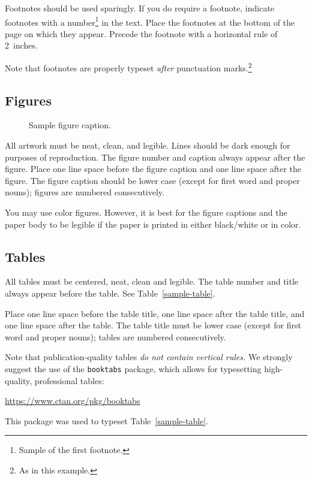 \documentclass[a4paper]{article}
\begin{document}
Footnotes should be used sparingly.  If you do require a footnote, indicate
footnotes with a number\footnote{Sample of the first footnote.} in the
text. Place the footnotes at the bottom of the page on which they appear.
Precede the footnote with a horizontal rule of 2~inches.


Note that footnotes are properly typeset \emph{after} punctuation
marks.\footnote{As in this example.}


\subsection{Figures}


\begin{figure}
  \centering
  \fbox{\rule[-.5cm]{0cm}{4cm} \rule[-.5cm]{4cm}{0cm}}
  \caption{Sample figure caption.}
\end{figure}


All artwork must be neat, clean, and legible. Lines should be dark enough for
purposes of reproduction. The figure number and caption always appear after the
figure. Place one line space before the figure caption and one line space after
the figure. The figure caption should be lower case (except for first word and
proper nouns); figures are numbered consecutively.


You may use color figures.  However, it is best for the figure captions and the
paper body to be legible if the paper is printed in either black/white or in
color.


\subsection{Tables}


All tables must be centered, neat, clean and legible.  The table number and
title always appear before the table.  See Table~\ref{sample-table}.


Place one line space before the table title, one line space after the
table title, and one line space after the table. The table title must
be lower case (except for first word and proper nouns); tables are
numbered consecutively.


Note that publication-quality tables \emph{do not contain vertical rules.} We
strongly suggest the use of the \verb+booktabs+ package, which allows for
typesetting high-quality, professional tables:
\begin{center}
  \url{https://www.ctan.org/pkg/booktabs}
\end{center}
This package was used to typeset Table~\ref{sample-table}.
\end{document}
